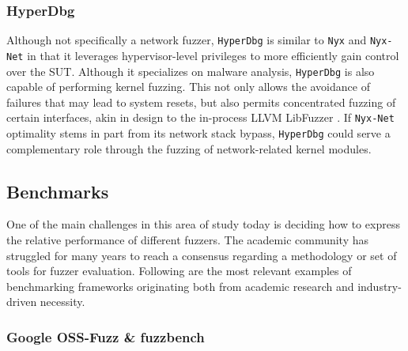 \subsubsection{HyperDbg}
\label{extend:netfuzz:survey:hyperdbg}

Although not specifically a network fuzzer, \texttt{HyperDbg} \cite{karvandi2022hyperdbg} is similar to \texttt{Nyx} and \texttt{Nyx-Net} in that it leverages hypervisor-level privileges to more efficiently gain control over the SUT. Although it specializes on malware analysis, \texttt{HyperDbg} is also capable of performing kernel fuzzing. This not only allows the avoidance of failures that may lead to system resets, but also permits concentrated fuzzing of certain interfaces, akin in design to the in-process LLVM LibFuzzer \cite{chao2018design}. If \texttt{Nyx-Net} optimality stems in part from its network stack bypass, \texttt{HyperDbg} could serve a complementary role through the fuzzing of network-related kernel modules.

\subsection{Benchmarks}
\label{extend:netfuzz:benchmarks}

One of the main challenges in this area of study today is deciding how to express the relative performance of different fuzzers. The academic community has struggled for many years to reach a consensus regarding a methodology or set of tools for fuzzer evaluation. Following are the most relevant examples of benchmarking frameworks originating both from academic research and industry-driven necessity. 

\subsubsection{Google OSS-Fuzz \& fuzzbench}
\label{extend:netfuzz:benchmarks:fuzzbench}


